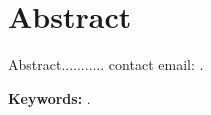 
\chapter*{Abstract}
\label{cha:abstract}


Abstract........... contact email: \contactauthor.


\textbf{Keywords:} \mybookkeywords.



